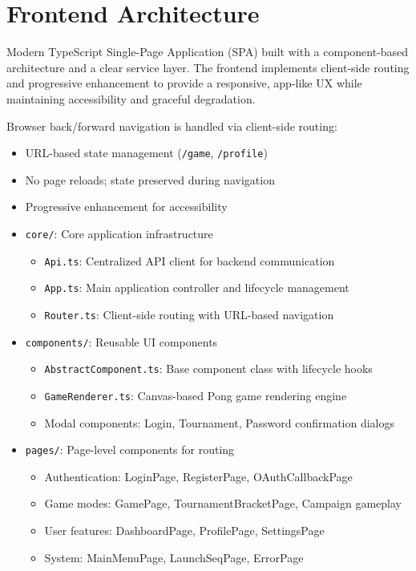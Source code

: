 \documentclass[11pt,a4paper]{report}
\begin{document}
\section{Frontend Architecture}
Modern TypeScript Single-Page Application (SPA) built with a component-based architecture and a clear service layer. The frontend implements client-side routing and progressive enhancement to provide a responsive, app-like UX while maintaining accessibility and graceful degradation.

Browser back/forward navigation is handled via client-side routing:
\begin{itemize}
  \item URL-based state management (\texttt{/game}, \texttt{/profile})
  \item No page reloads; state preserved during navigation
  \item Progressive enhancement for accessibility
  \item \texttt{core/}: Core application infrastructure
    \begin{itemize}
      \item \texttt{Api.ts}: Centralized API client for backend communication
      \item \texttt{App.ts}: Main application controller and lifecycle management
      \item \texttt{Router.ts}: Client-side routing with URL-based navigation
    \end{itemize}
  \item \texttt{components/}: Reusable UI components
    \begin{itemize}
      \item \texttt{AbstractComponent.ts}: Base component class with lifecycle hooks
      \item \texttt{GameRenderer.ts}: Canvas-based Pong game rendering engine
      \item Modal components: Login, Tournament, Password confirmation dialogs
    \end{itemize}
  \item \texttt{pages/}: Page-level components for routing
    \begin{itemize}
      \item Authentication: LoginPage, RegisterPage, OAuthCallbackPage
      \item Game modes: GamePage, TournamentBracketPage, Campaign gameplay
      \item User features: DashboardPage, ProfilePage, SettingsPage
      \item System: MainMenuPage, LaunchSeqPage, ErrorPage

\end{itemize}
\end{itemize}
\end{document}
